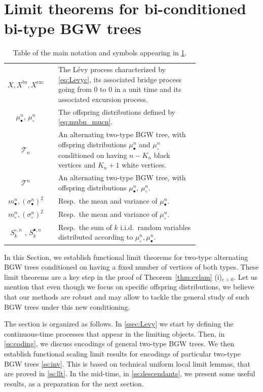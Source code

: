 \documentclass[AHL,XML,longabstracts,Unicode]{cedram}
\def\mubn{\mu_{\bullet}^{n}}
\def\mucn{\mu_{\circ}^{n}}
\def\mbn{m_{\bullet}^{n}}
\def\mcn{m_{\circ}^{n}}
\def\scn{\sigma_{\circ}^{n}}
\def\sbn{\sigma_{\bullet}^{n}}
\def\Sbn{S^{\bullet,n}}
\def\Scn{S^{\circ,n}}
\def \Xexc{X^{\mathrm{exc}}}
\def \Xbr{X^{\mathrm{br}}}
\begin{document}
\section{Limit theorems for bi-conditioned bi-type BGW trees}
\label{sec:limitheorems}


\begin{table}[htbp]\caption{Table of the main notation and symbols appearing in \cref{sec:limitheorems}.}
\centering
\begin{tabular}{c c p{0.75 \linewidth} }
\toprule
$X, \Xbr,\Xexc$ && The L\'evy process characterized by \eqref{eq:Levyc},  its associated  bridge process going from $0$ to $0$ in a unit time and its associated excursion process.\\
$\mubn$, $\mucn$&& The offspring distributions defined by \eqref{eq:mubn_mucn}.\\
$\mathscr{T}_{n}$ & & An alternating two-type BGW tree, with offspring distributions $\mubn$ and $\mucn$ conditioned on having $n-K_{n}$ black vertices and $K_{n}+1$ white vertices.
 \\
 $\mathscr{T}^{n}$ & & An alternating two-type BGW tree, with offspring distributions $\mubn$, $\mucn$.\\
 $\mbn,(\sbn)^{2}$ & & Resp.~the mean and variance of $\mubn$.\\
 $ \mcn,(\scn)^{2}$ & & Resp.~the mean and variance of $\mucn$.\\
 $\Scn_{k}$ , $\Sbn_{k}$ && Resp.~the sum of $k$ i.i.d.\ random variables distributed according to $\mucn,\mubn$.\\
\bottomrule
\end{tabular}
\label{tab:seclim}
\end{table}


In this Section, we establish functional limit theorems for two-type alternating BGW trees conditioned on having a fixed number of vertices of both types.
These limit theorems are a key step in the proof of Theorem~\ref{thm:cvlam} (i)$_{c>0}$.
Let us mention that even though we focus on  specific offspring distributions,
we believe that our methods are robust and may allow to tackle the general study of such BGW trees under this new conditioning.

The section is organized as follows.
In \cref{ssec:Levy} we start by defining the continuous-time processes
that appear in the limiting objects.
Then, in \cref{ss:coding}, we discuss encodings of general two-type BGW trees.
We then establish functional scaling limit results for encodings
of particular two-type BGW trees \cref{ss:inv}.
This is based on technical uniform local limit lemmas,
that are proved in \cref{ss:llt}.
In the mid-time, in \cref{ss:descendants},
we present some useful results, as a preparation for the next section.
\end{document}
